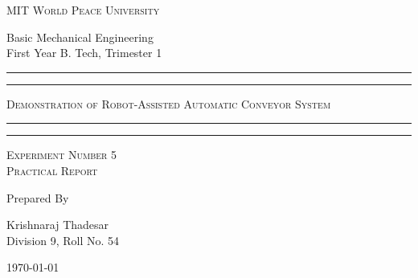 \documentclass[11pt]{article}
\begin{document}
	
	\begin{titlepage} 
		\centering 
		
		
		\huge\textsc{
			MIT World Peace University
		}\\
	
		\vspace{0.75\baselineskip} %
		
		\LARGE{
			Basic Mechanical Engineering\\
			First Year B. Tech, Trimester 1
		}
		
		\vfill %
		
		
		\rule{\textwidth}{1.6pt}\vspace*{-\baselineskip}\vspace*{2pt}
		\rule{\textwidth}{0.6pt}
		\vspace{0.75\baselineskip} %
		
		
		
		\huge{\textsc{
				Demonstration of Robot-Assisted Automatic Conveyor System
			}} \\
		
		
		
		\vspace{0.5\baselineskip} %
		\rule{\textwidth}{0.6pt}\vspace*{-\baselineskip}\vspace*{2.8pt}
		\rule{\textwidth}{1.6pt}
		
		\vspace{1\baselineskip} %

			
		\LARGE\textsc{
			Experiment Number 5\\Practical Report
		} %
		\vfill
		
		
		Prepared By
		\vspace{0.5\baselineskip} %
		
		\Large{
			Krishnaraj Thadesar \\
			Division 9, Roll No. 54
		}
		
		
		\vspace{0.5\baselineskip} %
		\today

	\end{titlepage}
	
\end{document}
